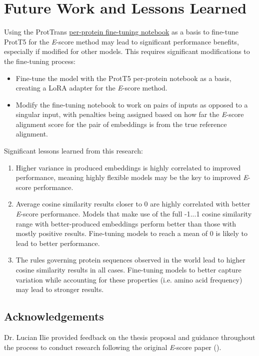 \chapter{Future Work and Lessons Learned}
Using the ProtTrans \href{https://github.com/rgavigan/e-score/blob/fae7672033f51adc77030f33a62d16ab415d17f5/src/fine-tune-t5-per-protein.ipynb}{per-protein fine-tuning notebook} as a basis to fine-tune ProtT5 for the \textit{E}-score method may lead to significant performance benefits, especially if modified for other models. This requires significant modifications to the fine-tuning process:
\begin{itemize}
    \item{Fine-tune the model with the ProtT5 per-protein notebook as a basis, creating a LoRA adapter for the \textit{E}-score method.}
    \item{Modify the fine-tuning notebook to work on pairs of inputs as opposed to a singular input, with penalties being assigned based on how far the \textit{E}-score alignment score for the pair of embeddings is from the true reference alignment.}
\end{itemize}

\noindent Significant lessons learned from this research:
\begin{enumerate}
    \item{Higher variance in produced embeddings is highly correlated to improved performance, meaning highly flexible models may be the key to improved \textit{E}-score performance.}
    \item{Average cosine similarity results closer to 0 are highly correlated with better \textit{E}-score performance. Models that make use of the full -1...1 cosine similarity range with better-produced embeddings perform better than those with mostly positive results. Fine-tuning models to reach a mean of 0 is likely to lead to better performance.}
    \item{The rules governing protein sequences observed in the world lead to higher cosine similarity results in all cases. Fine-tuning models to better capture variation while accounting for these properties (i.e. amino acid frequency) may lead to stronger results.}
\end{enumerate}

\section{Acknowledgements}
Dr. Lucian Ilie provided feedback on the thesis proposal and guidance throughout the process to conduct research following the original \textit{E}-score paper (\cite{Ashrafzadeh:2023}).